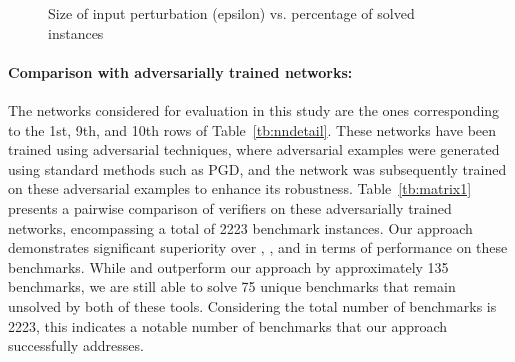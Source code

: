 \begin{figure}[]    \centering
\scalebox{0.8}{
  
  }
    \caption{Size of input perturbation (epsilon) vs. percentage of solved instances}
    \label{res:ep:milp_with_milp}
\end{figure}


\paragraph{Comparison with adversarially trained networks: }
The networks considered for evaluation in this study are the ones corresponding to the 1st, 9th, and 10th 
rows of Table~\ref{tb:nndetail}. These networks have been trained using adversarial techniques, 
where adversarial examples were generated using standard methods such as PGD, and the network was subsequently 
trained on these adversarial examples to enhance its robustness. Table~\ref{tb:matrix1} presents a 
pairwise comparison of verifiers on these adversarially trained networks, 
encompassing a total of 2223 benchmark instances. 
Our approach demonstrates significant superiority over \deeppoly{}, \kpoly{}, and \deepsrgr{} in terms of 
performance on these benchmarks. While \alphabeta{} and \ovaltool{} outperform our approach by approximately 
135 benchmarks, we are still able to solve 75 unique benchmarks that remain unsolved by both of these tools. 
Considering the total number of benchmarks is 2223, this indicates a notable number of benchmarks that our 
approach successfully addresses.


